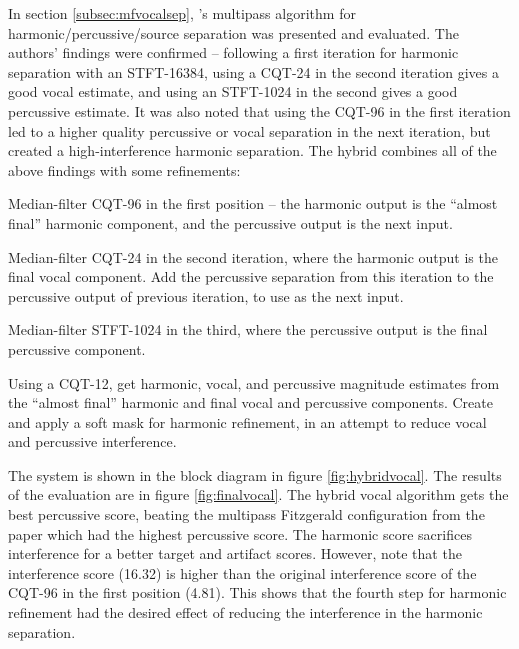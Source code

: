 \documentclass[letter,12pt]{article}
\newenvironment{tight_enumerate}{
\begin{enumerate}
  \setlength{\itemsep}{0pt}
  \setlength{\parskip}{0pt}
}{\end{enumerate}}
\begin{document}
In section \ref{subsec:mfvocalsep}, \citet{fitzgerald2}'s multipass algorithm for harmonic/percussive/source separation was presented and evaluated. The authors' findings were confirmed -- following a first iteration for harmonic separation with an STFT-16384, using a CQT-24 in the second iteration gives a good vocal estimate, and using an STFT-1024 in the second gives a good percussive estimate. It was also noted that using the CQT-96 in the first iteration led to a higher quality percussive or vocal separation in the next iteration, but created a high-interference harmonic separation. The hybrid combines all of the above findings with some refinements:

\begin{tight_enumerate}
	\item
		Median-filter CQT-96 in the first position -- the harmonic output is the ``almost final'' harmonic component, and the percussive output is the next input.
	\item
		Median-filter CQT-24 in the second iteration, where the harmonic output is the final vocal component. Add the percussive separation from this iteration to the percussive output of previous iteration, to use as the next input.
	\item
		Median-filter STFT-1024 in the third, where the percussive output is the final percussive component.
	\item
		Using a CQT-12, get harmonic, vocal, and percussive magnitude estimates from the ``almost final'' harmonic and final vocal and percussive components. Create and apply a soft mask for harmonic refinement, in an attempt to reduce vocal and percussive interference.
\end{tight_enumerate}

The system is shown in the block diagram in figure \ref{fig:hybridvocal}. The results of the evaluation are in figure \ref{fig:finalvocal}. The hybrid vocal algorithm gets the best percussive score, beating the multipass Fitzgerald configuration from the paper\cite{fitzgerald2} which had the highest percussive score. The harmonic score sacrifices interference for a better target and artifact scores. However, note that the interference score (16.32) is higher than the original interference score of the CQT-96 in the first position (4.81). This shows that the fourth step for harmonic refinement had the desired effect of reducing the interference in the harmonic separation.
\end{document}
